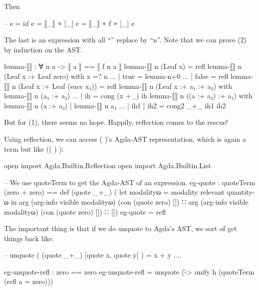 \documentclass{article}
\begin{document}
Then

\begin{code}
-- e = id e = ⟦_⟧ ∘ [_] e = ⟦_⟧ ∘ f ∘ [_] e
\end{code}

The last is an expression with all ``'' replace by ``n''. Note that we can prove (2) by induction on the AST.

\begin{code}
lemma-⟦⟧ : ∀ n a ->  ⟦ a ⟧ == ⟦ f n a ⟧
lemma-⟦⟧ n (Leaf x) = refl
lemma-⟦⟧ n (Leaf x :+ Leaf zero) with x =? n
... | true = lemma-n+0
... | false = refl
lemma-⟦⟧ n (Leaf x :+ Leaf (succ x₁)) = refl
lemma-⟦⟧ n (Leaf x :+ a₁ :+ a₂) with lemma-⟦⟧ n (a₁ :+ a₂)
... | ih = cong (x +_) ih
lemma-⟦⟧ n ((a :+ a₂) :+ a₁) with lemma-⟦⟧ n (a :+ a₂) | lemma-⟦⟧ n a₁
... | ih1 | ih2 = cong2 _+_ ih1 ih2
\end{code}

But for (1), there seems no hope. Happily, reflection comes to the rescue!

Using reflection, we can access \AgdaSymbol( \AgdaOperator{\AgdaFunction{+}} \AgdaSymbol)'s Agda-AST representation, which is again a term but like \AgdaSymbol(\AgdaSymbol( \AgdaFunction{\AgdaUnderscore{}+\AgdaUnderscore{}}\AgdaSymbol) \AgdaOperator{\AgdaFunction{[}}   \AgdaOperator{\AgdaInductiveConstructor{,}}   \AgdaOperator{\AgdaFunction{]}}\AgdaSymbol):

\begin{code}
open import Agda.Builtin.Reflection
open import Agda.Builtin.List

-- We use quoteTerm to get the Agda-AST of an expression.
eg-quote : quoteTerm (zero + zero) ==
  def (quote _+_)
      ( let modalityω = modality relevant quantity-ω in
        arg (arg-info visible modalityω) (con (quote zero) [])
      ∷ arg (arg-info visible modalityω) (con (quote zero) [])
      ∷ [])
eg-quote = refl
\end{code}

The important thing is that if we do unquote to Agda's AST, we sort of get things back like:

\begin{code}
-- unquote ( (quote _+_) [quote x, quote y] ) = x + y ....
\end{code}

\begin{code}
eg-unquote-refl : zero == zero
eg-unquote-refl = unquote (\h -> unify h (quoteTerm (refl {a = zero})))
\end{code}
\end{document}

